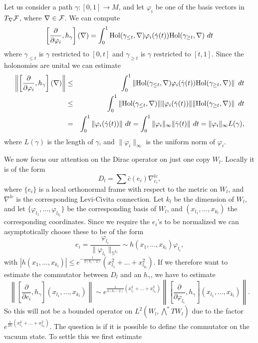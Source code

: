 \documentclass[letterpaper,11pt]{article}
\def\cf{{\cal F}}
\newcommand{\cF}{{\cal F}}
\begin{document}
Let us consider a path $\gamma :[0,1]\to M $, and let $\varphi_i$ be one of the basis vectors in $T_\nabla \cf$, where $\nabla \in \cF$. We can compute
$$\left[ \frac{\partial}{ \partial \varphi_i} , h_\gamma \right] (\nabla ) =\int_0^1 \hbox{Hol} (\gamma_{\leq t}, \nabla) \varphi_i(\dot{\gamma}(t))\hbox{Hol} (\gamma_{\geq t},\nabla )\  dt$$
where $\gamma_{\leq t}$ is $\gamma$ restricted to $[0,t]$ and $\gamma_{\geq t}$ is $\gamma$ restricted to $[t,1]$. Since the holonomies are unital we can estimate
\begin{eqnarray*}
\left\| \left[ \frac{\partial}{ \partial \varphi_i} , h_\gamma \right] (\nabla) \right\| &\leq &
\int_0^1 \left\|  \hbox{Hol} (\gamma_{\leq t}, \nabla) \varphi_i(\dot{\gamma}(t))\hbox{Hol} (\gamma_{\geq t},\nabla) \right\|\  dt \\
&\leq & \int_0^1 \left\|  \hbox{Hol} (\gamma_{\leq t}, \nabla)\| \| \varphi_i(\dot{\gamma}(t)) \| \|\hbox{Hol} (\gamma_{\geq t},\nabla) \right\|\  dt \\
&=& \int_0^1  \| \varphi_i(\dot{\gamma}(t)) \| \   dt =\int_0^1  \| \varphi_i\|_\infty \|\dot{\gamma}(t) \| \   dt  =\| \varphi_i\|_\infty L(\gamma), 
\end{eqnarray*}
where $L(\gamma)$ is the length of $\gamma$, and $\| \varphi_i\|_\infty$ is the uniform norm of $\varphi_i$.

We now focus our attention  on the Dirac operator on just one copy $W_l$. Locally it is of the form 
$$D_l=\sum \bar{c} (e_i)\nabla^{lc}_{e_i} , $$
where $\{e_i\}$ is a local orthonormal frame with respect to the metric on $W_l$, and $\nabla^{lc}$ is the corresponding Levi-Civita connection. Let $k_l$ be the dimension of $W_l$, and let $\{ \varphi_{l_1}, \ldots , \varphi_{l_{k_l}}\}$ be the corresponding basis of $W_l$, and $(x_{l_1}, \ldots , x_{k_{l}})$ the corresponding coordinates. Since we require the $e_i$'s to be normalized we can  asymptotically choose these to be of the form 
$$ e_i= \frac{\varphi_{l_i}}{\| \varphi_{l_1}\|_{\mathbb{S}^{k_l}}}\sim h(x_1,\ldots , x_{k_l}) \varphi_{l_i}    ,$$
with $|h(x_1,\ldots , x_{k_l})|\leq e^{-\frac{1}{2(k_l-2)}}(x_{l_1}^2+\ldots +x_{l_{k_l}}^2)$.
If we therefore want to estimate the commutator between $D_l$ and an $h_\gamma$, we have to estimate 
$$\left\| \left[ \frac{\partial}{ \partial e_i} , h_\gamma \right] (x_{l_1}, \ldots , x_{k_{l}}) \right\|\sim e^{\frac{1}{2(k_l-2)}(x_{l_1}^2+\ldots +x_{l_{k_l}}^2)} \left\| \left[ \frac{\partial}{ \partial \varphi_{l_i}} , h_\gamma \right] (x_{l_1}, \ldots , x_{k_{l}}) \right\| .$$
So this will not be a bounded operator on  $L^2(W_l,\bigwedge^*TW_l)$  due to the factor  $e^{\frac{1}{2k_l}(x_{l_1}^2+\ldots +x_{l_{k_l}}^2)}$. The question is if it is possible to define  the commutator on the vacuum state. To settle this we first estimate 
\end{document}
